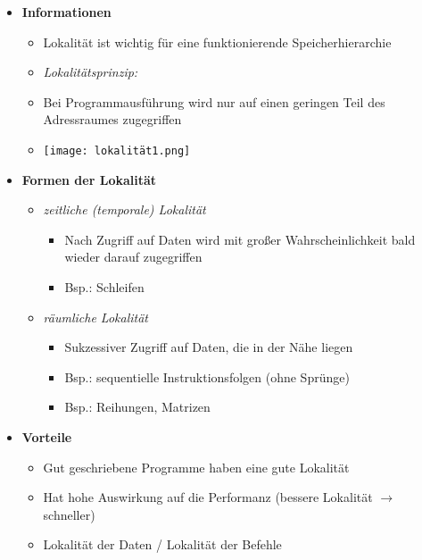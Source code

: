    \begin{itemize}
        \item \textbf{Informationen}
            \begin{itemize}
                \item Lokalität ist wichtig für eine funktionierende Speicherhierarchie
                \item \textit{Lokalitätsprinzip:}
                \item[] Bei Programmausführung wird nur auf einen geringen Teil des Adressraumes zugegriffen
                \item[] \texttt{[image: lokalität1.png]} 
            \end{itemize}

        \item \textbf{Formen der Lokalität}
            \begin{itemize}
                \item \textit{zeitliche (temporale) Lokalität}
                    \begin{itemize}
                        \item Nach Zugriff auf Daten wird mit großer Wahrscheinlichkeit bald wieder darauf zugegriffen
                        \item Bsp.: Schleifen
                    \end{itemize}
                \item \textit{räumliche Lokalität}
                    \begin{itemize}
                        \item Sukzessiver Zugriff auf Daten, die in der Nähe liegen
                        \item Bsp.: sequentielle Instruktionsfolgen (ohne Sprünge)
                        \item Bsp.: Reihungen, Matrizen
                    \end{itemize}
            \end{itemize}

        \item \textbf{Vorteile}
            \begin{itemize}
                \item Gut geschriebene Programme haben eine gute Lokalität
                \item Hat hohe Auswirkung auf die Performanz (bessere Lokalität $\rightarrow$ schneller)
                \item Lokalität der Daten / Lokalität der Befehle
            \end{itemize}


\end{itemize}
